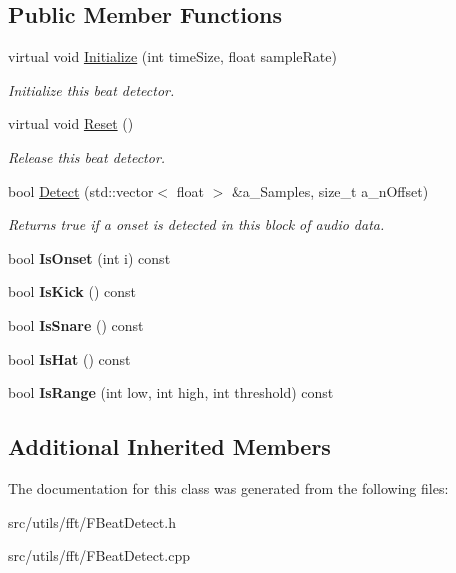 \subsection*{Public Member Functions}
\begin{DoxyCompactItemize}
\item 
\mbox{\label{class_f_beat_detect_a34a48d288ca04f08d4722dbff72252df}} 
virtual void \hyperlink{class_f_beat_detect_a34a48d288ca04f08d4722dbff72252df}{Initialize} (int time\+Size, float sample\+Rate)
\begin{DoxyCompactList}\small\item\em Initialize this beat detector. \end{DoxyCompactList}\item 
\mbox{\label{class_f_beat_detect_a141db57cfa7acc2a45e77ac28c970776}} 
virtual void \hyperlink{class_f_beat_detect_a141db57cfa7acc2a45e77ac28c970776}{Reset} ()
\begin{DoxyCompactList}\small\item\em Release this beat detector. \end{DoxyCompactList}\item 
\mbox{\label{class_f_beat_detect_ad6298d38e6ac967abeb1dec8f0339e1d}} 
bool \hyperlink{class_f_beat_detect_ad6298d38e6ac967abeb1dec8f0339e1d}{Detect} (std\+::vector$<$ float $>$ \&a\+\_\+\+Samples, size\+\_\+t a\+\_\+n\+Offset)
\begin{DoxyCompactList}\small\item\em Returns true if a onset is detected in this block of audio data. \end{DoxyCompactList}\item 
\mbox{\label{class_f_beat_detect_a5c892e74c4c1320a15fcaf6422b52417}} 
bool {\bfseries Is\+Onset} (int i) const
\item 
\mbox{\label{class_f_beat_detect_af83d0ffedd3b071c8003628150c8ca82}} 
bool {\bfseries Is\+Kick} () const
\item 
\mbox{\label{class_f_beat_detect_a3a83abb2a3b152b01dc4405c7f77bcbd}} 
bool {\bfseries Is\+Snare} () const
\item 
\mbox{\label{class_f_beat_detect_ae2867a9c4a488ffba2556d9732a0e868}} 
bool {\bfseries Is\+Hat} () const
\item 
\mbox{\label{class_f_beat_detect_a6f871db6cdeea7106ce2adbb676c053c}} 
bool {\bfseries Is\+Range} (int low, int high, int threshold) const
\end{DoxyCompactItemize}
\subsection*{Additional Inherited Members}


The documentation for this class was generated from the following files\+:\begin{DoxyCompactItemize}
\item 
src/utils/fft/F\+Beat\+Detect.\+h\item 
src/utils/fft/F\+Beat\+Detect.\+cpp\end{DoxyCompactItemize}
